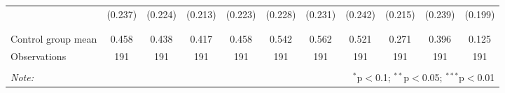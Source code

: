 \begin{tabular}{@{\extracolsep{5pt}}lcccccccccc}
  & (0.237) & (0.224) & (0.213) & (0.223) & (0.228) & (0.231) & (0.242) & (0.215) & (0.239) & (0.199) \\ 
  & & & & & & & & & & \\ 
\hline \\[-1.8ex] 
Control group mean & 0.458 & 0.438 & 0.417 & 0.458 & 0.542 & 0.562 & 0.521 & 0.271 & 0.396 & 0.125 \\ 
Observations & 191 & 191 & 191 & 191 & 191 & 191 & 191 & 191 & 191 & 191 \\ 
\hline 
\hline \\[-1.8ex] 
\textit{Note:}  & \multicolumn{10}{r}{$^{*}$p$<$0.1; $^{**}$p$<$0.05; $^{***}$p$<$0.01} \\ 
\end{tabular} 
